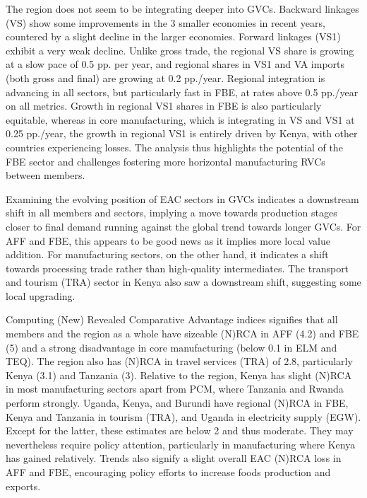 \documentclass[a4paper]{article}
\begin{document}
The region does not seem to be integrating deeper into GVCs. Backward linkages (VS) show some improvements in the 3 smaller economies in recent years, countered by a slight decline in the larger economies. Forward linkages (VS1) exhibit a very weak decline. Unlike gross trade, the regional VS share is growing at a slow pace of 0.5 pp. per year, and regional shares in VS1 and VA imports (both gross and final) are growing at 0.2 pp./year. Regional integration is advancing in all sectors, but particularly fast in FBE, at rates above 0.5 pp./year on all metrics. Growth in regional VS1 shares in FBE is also particularly equitable, whereas in core manufacturing, which is integrating in VS and VS1 at 0.25 pp./year, the growth in regional VS1 is entirely driven by Kenya, with other countries experiencing losses. The analysis thus highlights the potential of the FBE sector and challenges fostering more horizontal manufacturing RVCs between members. \newline

Examining the evolving position of EAC sectors in GVCs indicates a downstream shift in all members and sectors, implying a move towards production stages closer to final demand running against the global trend towards longer GVCs. For AFF and FBE, this appears to be good news as it implies more local value addition. For manufacturing sectors, on the other hand, it indicates a shift towards processing trade rather than high-quality intermediates. The transport and tourism (TRA) sector in Kenya also saw a downstream shift, suggesting some local upgrading. \newline

Computing (New) Revealed Comparative Advantage indices signifies that all members and the region as a whole have sizeable (N)RCA in AFF (4.2) and FBE (5) and a strong disadvantage in core manufacturing (below 0.1 in ELM and TEQ). The region also has (N)RCA in travel services (TRA) of 2.8, particularly Kenya (3.1) and Tanzania (3). Relative to the region, Kenya has slight (N)RCA in most manufacturing sectors apart from PCM, where Tanzania and Rwanda perform strongly. Uganda, Kenya, and Burundi have regional (N)RCA in FBE, Kenya and Tanzania in tourism (TRA), and Uganda in electricity supply (EGW). Except for the latter, these estimates are below 2 and thus moderate. They may nevertheless require policy attention, particularly in manufacturing where Kenya has gained relatively. Trends also signify a slight overall EAC (N)RCA loss in AFF and FBE, encouraging policy efforts to increase foods production and exports. \newline
\end{document}
